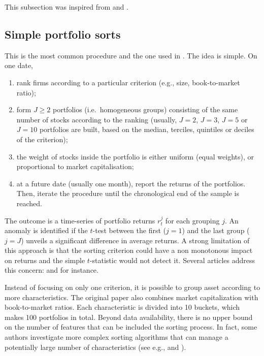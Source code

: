 \documentclass[]{krantz}
\providecommand{\tightlist}{%
  \setlength{\itemsep}{0pt}\setlength{\parskip}{0pt}}
\theoremstyle{definition}
\theoremstyle{definition}
\theoremstyle{definition}
\theoremstyle{remark}
\begin{document}
This subsection was inspired from \citet{baker2017detecting} and
\citet{harvey2017lucky}.

\hypertarget{simple-portfolio-sorts}{%
\subsection{Simple portfolio sorts}\label{simple-portfolio-sorts}}

This is the most common procedure and the one used in
\citet{fama1992cross}. The idea is simple. On one date,

\begin{enumerate}
\def\labelenumi{\arabic{enumi}.}
\tightlist
\item
  rank firms according to a particular criterion (e.g., size,
  book-to-market ratio);\\
\item
  form \(J\ge 2\) portfolios (i.e.~homogeneous groups) consisting of the
  same number of stocks according to the ranking (usually, \(J=2\),
  \(J=3\), \(J=5\) or \(J=10\) portfolios are built, based on the
  median, terciles, quintiles or deciles of the criterion);\\
\item
  the weight of stocks inside the portfolio is either uniform (equal
  weights), or proportional to market capitalisation;
\item
  at a future date (usually one month), report the returns of the
  portfolios.\\
  Then, iterate the procedure until the chronological end of the sample
  is reached.
\end{enumerate}

The outcome is a time-series of portfolio returns \(r_t^j\) for each
grouping \(j\). An anomaly is identified if the \(t\)-test between the
first (\(j=1\)) and the last group (\(j=J\)) unveils a significant
difference in average returns. A strong limitation of this approach is
that the sorting criterion could have a non monotonous impact on returns
and the simple \(t\)-statistic would not detect it. Several articles
address this concern: \citet{patton2010monotonicity} and
\citet{romano2013testing} for instance.

Instead of focusing on only one criterion, it is possible to group asset
according to more characteristics. The original paper
\citet{fama1992cross} also combines market capitalization with
book-to-market ratios. Each characteristic is divided into 10 buckets,
which makes 100 portfolios in total. Beyond data availability, there is
no upper bound on the number of features that can be included the
sorting process. In fact, some authors investigate more complex sorting
algorithms that can manage a potentially large number of characteristics
(see e.g., \citet{feng2019deep} and \citet{bryzgalova2019forest}).
\end{document}
